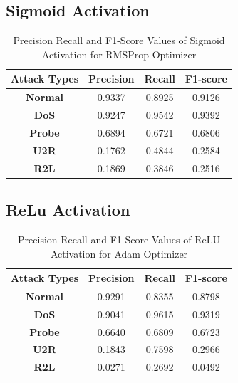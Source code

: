 \documentclass[12pt, a4paper]{report}
\begin{document}
\begin{appendices}
   \subsection{Sigmoid Activation}
   \begin{table}[h]
	\centering
	\captionsetup{justification=centering,margin=2cm}
	\begin{tabular}{|c|c|c|c|}
	\hline
	\textbf{Attack Types} & \textbf{Precision} & \textbf{Recall} & \textbf{F1-score} \\ \hline
	\textbf{Normal}       & 0.9337             & 0.8925          & 0.9126            \\ \hline
	\textbf{DoS}          & 0.9247             & 0.9542          & 0.9392            \\ \hline
	\textbf{Probe}        & 0.6894             & 0.6721          & 0.6806            \\ \hline
	\textbf{U2R}          & 0.1762             & 0.4844          & 0.2584            \\ \hline
	\textbf{R2L}          & 0.1869             & 0.3846          & 0.2516            \\ \hline
	\end{tabular}
	\caption{Precision Recall and F1-Score Values of Sigmoid Activation for RMSProp Optimizer}
	\label{classification sigmoid adam tflearn}
	\end{table} 
	
	\subsection{ReLu Activation}
   \begin{table}[h]
	\centering
	\captionsetup{justification=centering,margin=2cm}
	\begin{tabular}{|c|c|c|c|}
	\hline
	\textbf{Attack Types} & \textbf{Precision} & \textbf{Recall} & \textbf{F1-score} \\ \hline
	\textbf{Normal}       & 0.9291             & 0.8355          & 0.8798            \\ \hline
	\textbf{DoS}          & 0.9041             & 0.9615          & 0.9319            \\ \hline
	\textbf{Probe}        & 0.6640             & 0.6809          & 0.6723            \\ \hline
	\textbf{U2R}          & 0.1843             & 0.7598          & 0.2966            \\ \hline
	\textbf{R2L}          & 0.0271             & 0.2692          & 0.0492            \\ \hline
	\end{tabular}
	\caption{Precision Recall and F1-Score Values of ReLU Activation for Adam Optimizer}
	\label{classification relu adam tflearn}
	\end{table} 


\end{appendices}
\end{document}
